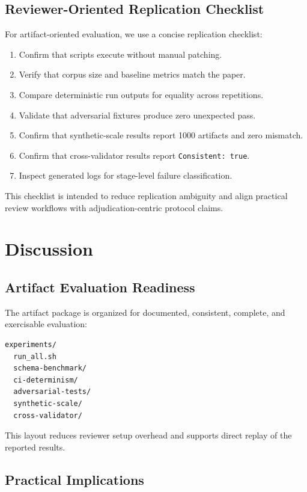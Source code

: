 \documentclass[10pt,conference]{IEEEtran}
\begin{document}
\subsection{Reviewer-Oriented Replication Checklist}

For artifact-oriented evaluation, we use a concise replication checklist:
\begin{enumerate}
\item Confirm that scripts execute without manual patching.
\item Verify that corpus size and baseline metrics match the paper.
\item Compare deterministic run outputs for equality across repetitions.
\item Validate that adversarial fixtures produce zero unexpected pass.
\item Confirm that synthetic-scale results report 1000 artifacts and zero mismatch.
\item Confirm that cross-validator results report \texttt{Consistent: true}.
\item Inspect generated logs for stage-level failure classification.
\end{enumerate}

This checklist is intended to reduce replication ambiguity and align practical
review workflows with adjudication-centric protocol claims.

\section{Discussion}

\subsection{Artifact Evaluation Readiness}

The artifact package is organized for documented, consistent, complete, and
exercisable evaluation:

\begin{verbatim}
experiments/
  run_all.sh
  schema-benchmark/
  ci-determinism/
  adversarial-tests/
  synthetic-scale/
  cross-validator/
\end{verbatim}

This layout reduces reviewer setup overhead and supports direct replay of the
reported results.

\subsection{Practical Implications}
\end{document}
